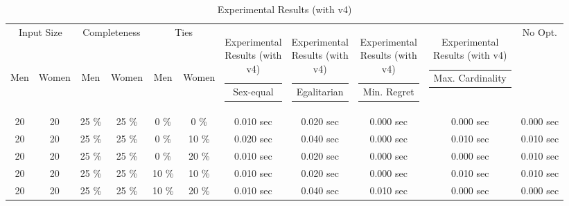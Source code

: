 \documentclass{article}
\begin{document}
\setlength\LTleft{-1.3in}

\small

\begin{longtable}[]{@{}ccccccccccc@{}}

\caption{Experimental Results (with v4)}
\label{exp-v4}\\

\hline \multicolumn{2}{c}{Input Size} & \multicolumn{2}{c}{Completeness} & \multicolumn{2}{c}{Ties} & \multicolumn{1}{c}{\multirow{2}{*}{\begin{tabular}[c]{@{}c@{}}Sex-equal\end{tabular}}} & \multicolumn{1}{c}{\multirow{2}{*}{\begin{tabular}[c]{@{}c@{}}Egalitarian\end{tabular}}} & \multicolumn{1}{c}{\multirow{2}{*}{\begin{tabular}[c]{@{}c@{}}Min. Regret\end{tabular}}} & \multicolumn{1}{c}{\multirow{2}{*}{\begin{tabular}[c]{@{}c@{}}Max. Cardinality\end{tabular}}} & \multicolumn{1}{c}{\multirow{2}{*}{No Opt.}} \\
Men           & Women          & Men             & Women          & Men         & Women      & \multicolumn{1}{c}{}                                                                                  & \multicolumn{1}{c}{}                                                                                    & \multicolumn{1}{c}{}                                                                                       & \multicolumn{1}{c}{}                                                                                            & \multicolumn{1}{c}{}                                 \\ \hline
\endhead
%
\bottomrule
\endfoot
%
\endlastfoot
%
20 & 20 & 25 \% & 25 \% & 0 \% & 0 \% & 0.010 sec & 0.020 sec & 0.000 sec & 0.000 sec & 0.000 sec \\
20 & 20 & 25 \% & 25 \% & 0 \% & 10 \% & 0.020 sec & 0.040 sec & 0.000 sec & 0.010 sec & 0.010 sec \\
20 & 20 & 25 \% & 25 \% & 0 \% & 20 \% & 0.010 sec & 0.020 sec & 0.000 sec & 0.000 sec & 0.010 sec \\
20 & 20 & 25 \% & 25 \% & 10 \% & 10 \% & 0.010 sec & 0.020 sec & 0.000 sec & 0.010 sec & 0.010 sec \\
20 & 20 & 25 \% & 25 \% & 10 \% & 20 \% & 0.010 sec & 0.040 sec & 0.010 sec & 0.000 sec & 0.000 sec \\

\end{longtable}
\end{document}
